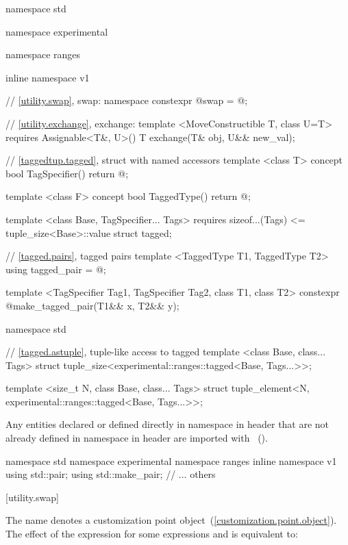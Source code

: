 \begin{codeblock}
namespace std { namespace experimental { namespace ranges { inline namespace v1 {
  // \ref{utility.swap}, swap:
  namespace {
    constexpr @\unspec@ swap = @\unspec@;
  }

  // \ref{utility.exchange}, exchange:
  template <MoveConstructible T, class U=T>
    requires Assignable<T&, U>()
  T exchange(T& obj, U&& new_val);

  // \ref{taggedtup.tagged}, struct with named accessors
  template <class T>
  concept bool TagSpecifier() {
    return @\seebelow@;
  }

  template <class F>
  concept bool TaggedType() {
    return @\seebelow@;
  }

  template <class Base, TagSpecifier... Tags>
    requires sizeof...(Tags) <= tuple_size<Base>::value
  struct tagged;

  // \ref{tagged.pairs}, tagged pairs
  template <TaggedType T1, TaggedType T2> using tagged_pair = @\seebelow@;

  template <TagSpecifier Tag1, TagSpecifier Tag2, class T1, class T2>
  constexpr @\seebelow@ make_tagged_pair(T1&& x, T2&& y);
}}}}

namespace std {
  // \ref{tagged.astuple}, tuple-like access to tagged
  template <class Base, class... Tags>
  struct tuple_size<experimental::ranges::tagged<Base, Tags...>>;

  template <size_t N, class Base, class... Tags>
  struct tuple_element<N, experimental::ranges::tagged<Base, Tags...>>;
}
\end{codeblock}

\pnum
Any entities declared or defined directly in namespace  in header 
that are not already defined in namespace  in header
 are imported with
~(). \enterexample
\begin{codeblock}
namespace std { namespace experimental { namespace ranges { inline namespace v1 {
  using std::pair;
  using std::make_pair;
  // ... others
}}}}
\end{codeblock}
\exitexample

[utility.swap]{}

%
\pnum The name  denotes a customization point
object~(\ref{customization.point.object}). The effect of the expression
 for some expressions 
and  is equivalent to:

